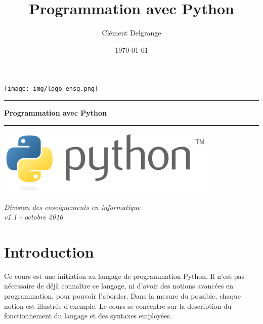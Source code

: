 \documentclass[12pt, a4paper]{article}
\title{Programmation avec Python}
\author{Clément Delgrange}
\date{\today}
\begin{document}
\begin{titlepage}
	\begin{sffamily}
		\begin{flushleft}
			\texttt{[image: img/logo\_ensg.png]}\\[1.5cm]
		\end{flushleft}
		\begin{flushright}
		\end{flushright}
		
		\vspace{1cm}
		
		\begin{center}
			\hrule
				\vspace{0.5cm}
				{\huge \bfseries Programmation avec Python}
				\vspace{0.7cm}
			\hrule
			
			\vspace{3.5cm}
			\includegraphics[width=400px]{img/logo_python.png}
			\vspace{5cm}
		
			\large \textit{Division des enseignements en informatique}\\
			\small \textit{v1.1 - octobre 2016}
		\end{center}
	\end{sffamily}
\end{titlepage}


\setcounter{tocdepth}{1}
\renewcommand{\partname}{Partie}
\tableofcontents



\newpage
\part*{Introduction}
Ce cours est une initiation au langage de programmation Python. Il n'est pas nécessaire de déjà connaître ce langage, ni d'avoir des notions avancées en programmation, pour pouvoir l'aborder. Dans la mesure du possible, chaque notion est illustrée d'exemple. Le cours se concentre sur la description du fonctionnement du langage et des syntaxes employées.
\end{document}
